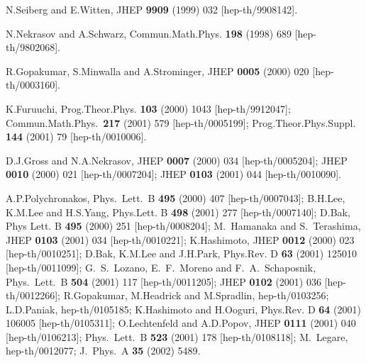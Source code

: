 \documentclass[a4paper,11pt]{article}
\numberwithin{equation}{section}
\begin{document}
\begin{thebibliography}{99}

N.Seiberg and E.Witten,
JHEP {\bf 9909} (1999) 032 [hep-th/9908142].


N.Nekrasov and A.Schwarz,
Commun.Math.Phys.  {\bf 198} (1998) 689 [hep-th/9802068].


R.Gopakumar, S.Minwalla and A.Strominger,
JHEP {\bf 0005} (2000) 020
[hep-th/0003160].

K.Furuuchi,
Prog.Theor.Phys.  {\bf 103} (2000) 1043 [hep-th/9912047];
Commun.Math.Phys.\  {\bf 217} (2001) 579 [hep-th/0005199];
Prog.Theor.Phys.Suppl. {\bf 144} (2001) 79 [hep-th/0010006].


D.J.Gross and N.A.Nekrasov,
JHEP {\bf 0007} (2000) 034
[hep-th/0005204];
JHEP {\bf 0010} (2000) 021
[hep-th/0007204];
JHEP {\bf 0103} (2001) 044
[hep-th/0010090].

A.P.Polychronakos,
Phys.\ Lett.\ B {\bf 495} (2000) 407
[hep-th/0007043];
B.H.Lee, K.M.Lee and H.S.Yang,
Phys.Lett. B {\bf 498} (2001) 277
[hep-th/0007140];
D.Bak,
Phys Lett. B {\bf 495} (2000) 251
[hep-th/0008204];
M.~Hamanaka and S.~Terashima,
JHEP {\bf 0103} (2001) 034
[hep-th/0010221];
K.Hashimoto,
JHEP {\bf 0012} (2000) 023
[hep-th/0010251];
D.Bak, K.M.Lee and J.H.Park,
Phys.Rev. D {\bf 63} (2001) 125010
[hep-th/0011099];
G.~S.~Lozano, E.~F.~Moreno and F.~A.~Schaposnik,
Phys.\ Lett.\ B {\bf 504} (2001) 117
[hep-th/0011205];
JHEP {\bf 0102} (2001) 036
[hep-th/0012266];
R.Gopakumar, M.Headrick and M.Spradlin,
hep-th/0103256;
L.D.Paniak,
hep-th/0105185;
K.Hashimoto and H.Ooguri,
Phys.Rev. D {\bf 64} (2001) 106005
[hep-th/0105311];
O.Lechtenfeld and A.D.Popov,
JHEP {\bf 0111} (2001) 040
[hep-th/0106213];
Phys.\ Lett.\ B {\bf 523} (2001) 178
[hep-th/0108118];
M.~Legare, hep-th/0012077;
J.\ Phys.\ A {\bf 35} (2002) 5489.



\end{thebibliography}
\end{document}
